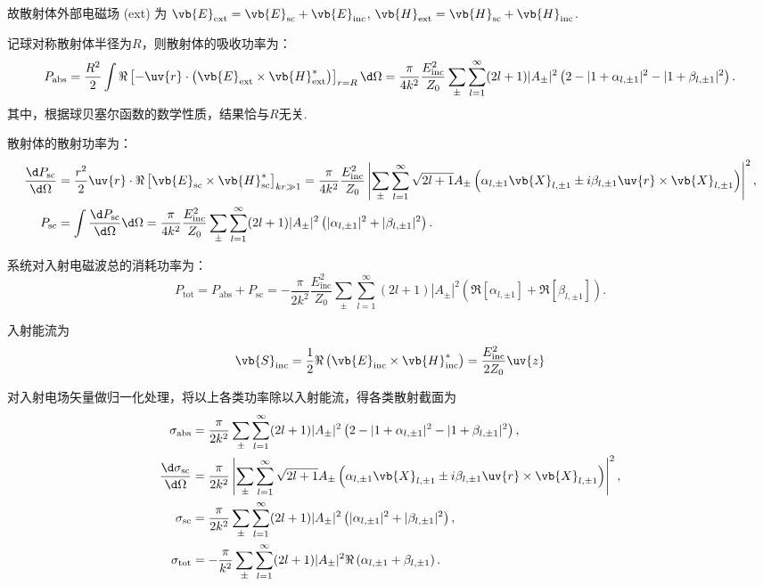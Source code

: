 故散射体外部电磁场 (ext) 为
\(\vb{E}_{\text{ext}}=\vb{E}_{\text{sc}}+\vb{E}_{\text{inc}}\), \(\vb{H}_{\text{ext}}=\vb{H}_{\text{sc}}+\vb{H}_{\text{inc}}\).

记球对称散射体半径为\(R\)，则散射体的吸收功率为：
\begin{equation*}
	P_{\text{abs}} = \frac{R^2}{2}\int\Re\left[-\uv{r}\cdot\left(\vb{E}_{\text{ext}}\times\vb{H}_{\text{ext}}^*\right)\right]_{r=R}\d \Omega = \frac{\pi}{4k^2}\frac{E_{\text{inc}}^2}{Z_0}\sum_{\pm}\sum_{l=1}^{\infty}(2l+1)|A_{\pm}|^2\left(2-|1+\alpha_{l,\pm1}|^2-|1+\beta_{l,\pm1}|^2\right).
\end{equation*}
其中，根据球贝塞尔函数的数学性质，结果恰与\(R\)无关.

散射体的散射功率为：
\begin{align*}
	\frac{\d P_{\text{sc}}}{\d \Omega} & = \frac{r^2}{2}\uv{r}\cdot\Re\left[\vb{E}_{\text{sc}}\times\vb{H}_{\text{sc}}^*\right]_{kr\gg1}  = \frac{\pi}{4k^2}\frac{E_{\text{inc}}^2}{Z_0}\left|\sum_{\pm}\sum_{l=1}^{\infty}\sqrt{2l+1}A_{\pm}\left(\alpha_{l,\pm1}\vb{X}_{l,\pm1}\pm i\beta_{l,\pm1}\uv{r}\times\vb{X}_{l,\pm1}\right)\right|^2, \\
	P_{\text{sc}}                      & = \int\frac{\d P_{\text{sc}}}{\d \Omega}\d \Omega = \frac{\pi}{4k^2}\frac{E_{\text{inc}}^2}{Z_0}\sum_{\pm}\sum_{l=1}^{\infty}(2l+1)|A_{\pm}|^2\left(|\alpha_{l,\pm1}|^2+|\beta_{l,\pm1}|^2\right).
\end{align*}

系统对入射电磁波总的消耗功率为：
\begin{equation*}
	P_{\text{tot}}=P_{\text{abs}}+P_{\text{sc}}=-\frac{\pi}{2k^2}\frac{E_{\text{inc}}^2}{Z_0}\sum_{\pm}\sum_{l=1}^{\infty}(2l+1)|A_{\pm}|^2\left(\Re[\alpha_{l,\pm1}]+\Re[\beta_{l,\pm1}]\right).
\end{equation*}

入射能流为
\begin{equation*}
	\vb{S}_{\text{inc}}=\frac{1}{2}\Re\left(\vb{E}_{\text{inc}}\times\vb{H}_{\text{inc}}^*\right)=\frac{E_{\text{inc}}^2}{2Z_0}\uv{z}
\end{equation*}

对入射电场矢量做归一化处理，将以上各类功率除以入射能流，得各类散射截面为
\begin{align*}
	\sigma_{\text{abs}}                     & = \frac{\pi}{2k^2}\sum_{\pm}\sum_{l=1}^{\infty}(2l+1)|A_{\pm}|^2\left(2-|1+\alpha_{l,\pm1}|^2-|1+\beta_{l,\pm1}|^2\right),                                                 \\
	\frac{\d \sigma_{\text{sc}}}{\d \Omega} & = \frac{\pi}{2k^2}\left|\sum_{\pm}\sum_{l=1}^{\infty}\sqrt{2l+1}A_{\pm}\left(\alpha_{l,\pm1}\vb{X}_{l,\pm1}\pm i\beta_{l,\pm1}\uv{r}\times\vb{X}_{l,\pm1}\right)\right|^2, \\
	\sigma_{\text{sc}}                      & = \frac{\pi}{2k^2}\sum_{\pm}\sum_{l=1}^{\infty}(2l+1)|A_{\pm}|^2\left(|\alpha_{l,\pm1}|^2+|\beta_{l,\pm1}|^2\right),                                                       \\
	\sigma_{\text{tot}}                     & = -\frac{\pi}{k^2}\sum_{\pm}\sum_{l=1}^{\infty}(2l+1)|A_{\pm}|^2\Re\left(\alpha_{l,\pm1}+\beta_{l,\pm1}\right).
\end{align*}

